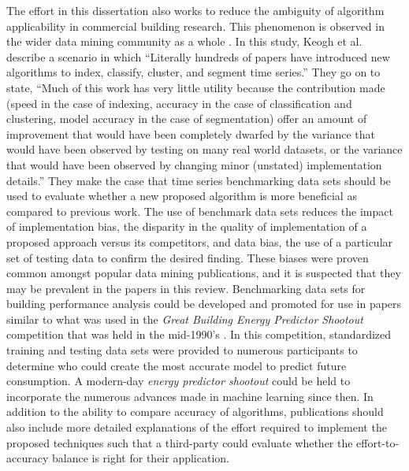 The effort in this dissertation also works to reduce the ambiguity of algorithm applicability in commercial building research. This phenomenon is observed in the wider data mining community as a whole \citep{keogh_need_2003}. In this study, Keogh et al. describe a scenario in which ``Literally hundreds of papers have introduced new algorithms to index, classify, cluster, and segment time series.'' They go on to state, ``Much of this work has very little utility because the contribution made (speed in the case of indexing, accuracy in the case of classification and clustering, model accuracy in the case of segmentation) offer an amount of improvement that would have been completely dwarfed by the variance that would have been observed by testing on many real world datasets, or the variance that would have been observed by changing minor (unstated) implementation details.'' They make the case that time series benchmarking data sets should be used to evaluate whether a new proposed algorithm is more beneficial as compared to previous work. The use of benchmark data sets reduces the impact of implementation bias, the disparity in the quality of implementation of a proposed approach versus its competitors, and data bias, the use of a particular set of testing data to confirm the desired finding. These biases were proven common amongst popular data mining publications, and it is suspected that they may be prevalent in the papers in this review. Benchmarking data sets for building performance analysis could be developed and promoted for use in papers similar to what was used in the \emph{Great Building Energy Predictor Shootout} competition that was held in the mid-1990's \citep{kreider_predicting_1994}. In this competition, standardized training and testing data sets were provided to numerous participants to determine who could create the most accurate model to predict future consumption. A modern-day \emph{energy predictor shootout} could be held to incorporate the numerous advances made in machine learning since then. In addition to the ability to compare accuracy of algorithms, publications should also include more detailed explanations of the effort required to implement the proposed techniques such that a third-party could evaluate whether the effort-to-accuracy balance is right for their application.

